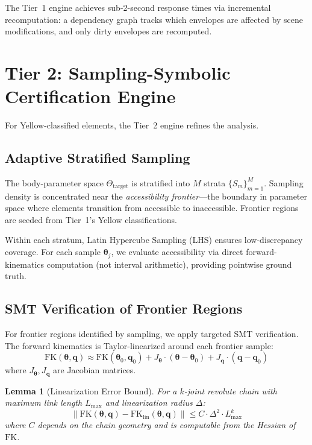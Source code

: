 \documentclass[11pt,letterpaper]{article}
\newtheorem{lemma}[theorem]{Lemma}
\newcommand{\FK}{\mathrm{FK}}
\newcommand{\param}{\Theta}
\newcommand{\bodyp}{\boldsymbol{\theta}}
\newcommand{\joint}{\mathbf{q}}
\begin{document}
The Tier~1 engine achieves sub-2-second response times via incremental recomputation: a dependency graph tracks which envelopes are affected by scene modifications, and only dirty envelopes are recomputed.

\section{Tier 2: Sampling-Symbolic Certification Engine}
\label{sec:tier2}

For Yellow-classified elements, the Tier~2 engine refines the analysis.

\subsection{Adaptive Stratified Sampling}

The body-parameter space $\param_{\mathrm{target}}$ is stratified into $M$ strata $\{S_m\}_{m=1}^M$.
Sampling density is concentrated near the \emph{accessibility frontier}---the boundary in parameter space where elements transition from accessible to inaccessible.
Frontier regions are seeded from Tier~1's Yellow classifications.

Within each stratum, Latin Hypercube Sampling (LHS) ensures low-discrepancy coverage.
For each sample $\bodyp_j$, we evaluate accessibility via direct forward-kinematics computation (not interval arithmetic), providing pointwise ground truth.

\subsection{SMT Verification of Frontier Regions}

For frontier regions identified by sampling, we apply targeted SMT verification.
The forward kinematics is Taylor-linearized around each frontier sample:
\begin{equation}
\FK(\bodyp, \joint) \approx \FK(\bodyp_0, \joint_0) + J_{\bodyp} \cdot (\bodyp - \bodyp_0) + J_{\joint} \cdot (\joint - \joint_0)
\label{eq:linearization}
\end{equation}
where $J_{\bodyp}, J_{\joint}$ are Jacobian matrices.

\begin{lemma}[Linearization Error Bound]
\label{lem:linear-error}
For a $k$-joint revolute chain with maximum link length $L_{\max}$ and linearization radius $\Delta$:
\begin{equation}
\|\FK(\bodyp, \joint) - \FK_{\mathrm{lin}}(\bodyp, \joint)\| \leq C \cdot \Delta^2 \cdot L_{\max}^k
\end{equation}
where $C$ depends on the chain geometry and is computable from the Hessian of $\FK$.
\end{lemma}
\end{document}
